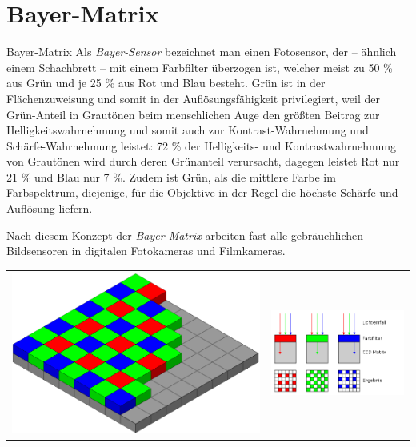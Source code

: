 \section{Bayer-Matrix}

\begin{defi}{Bayer-Matrix}
    Als \emph{Bayer-Sensor} bezeichnet man einen Fotosensor, der -- ähnlich einem Schachbrett -- mit einem Farbfilter überzogen ist, welcher meist zu 50 \% aus Grün und je 25 \% aus Rot und Blau besteht.
    Grün ist in der Flächenzuweisung und somit in der Auflösungsfähigkeit privilegiert, weil der Grün-Anteil in Grautönen beim menschlichen Auge den größten Beitrag zur Helligkeitswahrnehmung und somit auch zur Kontrast-Wahrnehmung und Schärfe-Wahrnehmung leistet:
    72 \% der Helligkeits- und Kontrastwahrnehmung von Grautönen wird durch deren Grünanteil verursacht, dagegen leistet Rot nur 21 \% und Blau nur 7 \%.
    Zudem ist Grün, als die mittlere Farbe im Farbspektrum, diejenige, für die Objektive in der Regel die höchste Schärfe und Auflösung liefern.

    Nach diesem Konzept der \emph{Bayer-Matrix} arbeiten fast alle gebräuchlichen Bildsensoren in digitalen Fotokameras und Filmkameras.

    \centering
    \begin{tabular}{cc}
        \includegraphics[width=0.5\linewidth]{figures/bayer-matrix.png} &
        \includegraphics[width=0.5\linewidth]{figures/bayer-sensor.png}
    \end{tabular}
\end{defi}


